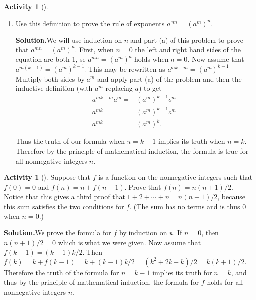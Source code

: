 \documentclass[10pt,]{book}
\theoremstyle{plain}
\theoremstyle{definition}
\newtheorem{activity}[project]{Activity}
\numberwithin{equation}{chapter}
\newcommand{\amp}{&}
\begin{document}
\begin{activity}[]
\begin{enumerate}[label=(\alph*)]
~\par
\item Use this definition to prove the rule of exponents \(a^{mn} =
(a^m)^n\).%
\par\medskip\noindent%
\textbf{Solution.}\quad We will use induction on \(n\) and part (a) of this problem to prove that \(a^{mn}=(a^m)^n\). First, when \(n=0\) the left and right hand sides of the equation are both 1, so \(a^{mn}=(a^m)^n\) holds when \(n=0\). Now assume that \(a^{m(k-1)} =(a^m)^{k-1}\). This may be rewritten as \(a^{mk-m}=(a^m)^{k-1}\) Multiply both sides by \(a^m\) and apply part (a) of the problem and then the inductive definition (with \(a^m\) replacing \(a\)) to get%
\begin{align*}
a^{mk-m}a^m =\amp (a^m)^{k-1}a^m\\
a^{mk} =\amp (a^m)^{k-1}a^m\\
a^{mk} =\amp (a^m)^k.
\end{align*}
%
\par
Thus the truth of our formula when \(n=k-1\) implies its truth when \(n=k\). Therefore by the principle of mathematical induction, the formula is true for all nonnegative integers \(n\).%

\end{enumerate}
\end{activity}
\begin{activity}[]\label{activity-75}
Suppose that \(f\) is a function on the nonnegative integers such that \(f(0)=0\) and \(f(n) = n+f(n-1)\). Prove that \(f(n) = n(n+1)/2\). Notice that this gives a third proof that \(1+2+\cdots+n=n(n+1)/2\), because this sum satisfies the two conditions for \(f\). (The sum has no terms and is thus 0 when \(n=0\).)%
\par\medskip\noindent%
\textbf{Solution.}\quad We prove the formula for \(f\) by induction on \(n\). If \(n=0\), then \(n(n+1)/2=0\) which is what we were given. Now assume that \(f(k-1)=
(k-1)k/2\). Then \(f(k)= k+f(k-1)= k+(k-1)k/2=(k^2+2k-k)/2=k(k+1)/2\). Therefore the truth of the formula for \(n=k-1\) implies its truth for \(n=k\), and thus by the principle of mathematical induction, the formula for \(f\) holds for all nonnegative integers \(n\).%
\end{activity}
\end{document}
